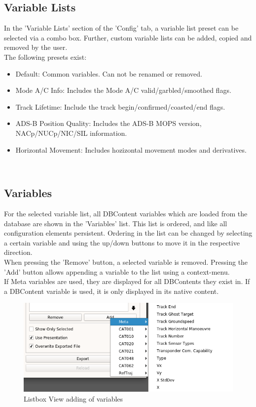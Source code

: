 \subsection{Variable Lists}

In the 'Variable Lists' section of the 'Config' tab, a variable list preset can be selected via a combo box. 
Further, custom variable lists can be added, copied and removed by the user. \\

The following presets exist:

\begin{itemize}
\item Default: Common variables. Can not be renamed or removed.
\item Mode A/C Info: Includes the Mode A/C valid/garbled/smoothed flags.
\item Track Lifetime: Include the track begin/confirmed/coasted/end flags.
\item ADS-B Position Quality: Includes the ADS-B MOPS version, NACp/NUCp/NIC/SIL information.
\item Horizontal Movement: Includes hozizontal movement modes and derivatives.
\end{itemize}
\ \\

\subsection{Variables}

For the selected variable list, all DBContent variables which are loaded from the database are shown in the 'Variables' list. 
This list is ordered, and like all configuration elements persistent. 
Ordering in the list can be changed by selecting a certain variable and using the up/down buttons to move it in the respective direction. \\

When pressing the 'Remove' button, a selected variable is removed. Pressing the 'Add' button allows appending a variable to the list using a context-menu. \\

If Meta variables are used, they are displayed for all DBContents they exist in. If a DBContent variable is used, it is only displayed in its native content.

\begin{figure}[H]
    \includegraphics[width=16cm,frame]{figures/listbox_add.png}
  \caption{Listbox View adding of variables}
\end{figure}

